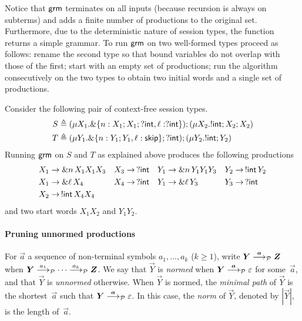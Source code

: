 %

Notice that $\mathsf{grm}$ terminates on all inputs (because recursion is
always on subterms) and adds a finite number of productions to the
original set. Furthermore, due to the deterministic nature of session
types, the function returns a simple grammar.
%
To run $\mathsf{grm}$ on two well-formed types proceed as follows: rename the
second type so that bound variables do not overlap with those of the
first; start with an empty set of productions; run the algorithm
consecutively on the two types to obtain two initial words and a
single set of productions.

\begin{example}
  \label{ex:productions}
  Consider the following pair of context-free session types.
  \begin{align*}
    S & \triangleq (\mu X_1. \&\{n: X_1;X_1;?\mathsf{int}, \ell: ?\mathsf{int}\});(\mu X_2. !\mathsf{int} ; X_2;X_2)\\
    T & \triangleq (\mu Y_1. \&\{n: Y_1;Y_1, \ell: \mathsf{skip}\};?\mathsf{int});(\mu Y_2. !\mathsf{int} ; Y_2)
  \end{align*}
  Running $\mathsf{grm}$ on $S$ and $T$ as explained above produces
  the following productions
  \begin{align*}
    X_1 &\rightarrow \& n\, X_1 X_1 X_3 & X_3 &\rightarrow \,? \mathsf{int} &
    Y_1 &\rightarrow \& n\, Y_1 Y_1 Y_3 & Y_2 &\rightarrow \,!\mathsf{int}\, Y_2 
    \\
    X_1 &\rightarrow \& \ell\, X_4           & X_4 &\rightarrow \,? \mathsf{int} &
    Y_1 &\rightarrow \& \ell \,Y_3           & Y_3 &\rightarrow \,? \mathsf{int}
    \\
    X_2 &\rightarrow \,!\mathsf{int}\, X_4 X_4
  \end{align*}
  and two start words $X_1X_2$ and $Y_1Y_2$.
\end{example}

\paragraph{Pruning unnormed productions}

For $\vec a$ a sequence of non-terminal symbols $a_1,\ldots, a_k$
($k\ge1$), write $\vec Y \LTSderivesP[\vec a] \vec Z$ when
$\vec Y \LTSderivesP[a_1] \cdots \LTSderivesP[a_k] \vec Z$.
%
We say that $\vec Y$ is \emph{normed} when
$\vec Y \LTSderivesP[\vec a] \varepsilon$ for some~$\vec a$, and that
$\vec Y$ is \emph{unnormed} otherwise.
%
When $\vec Y$ is normed, the \emph{minimal path} of $\vec Y$ is the
shortest~$\vec a$ such that $\vec Y \LTSderivesP[\vec a]
\varepsilon$.
%
In this case, the \emph{norm} of $\vec Y$, denoted by $|\vec Y|$, is
the length of~$\vec a$.

